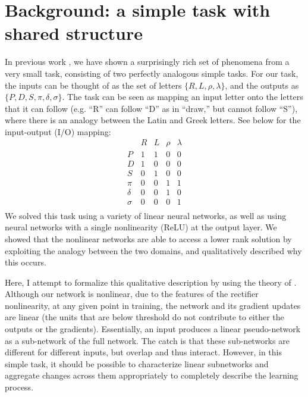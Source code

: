\documentclass[11pt]{article}
\begin{document}
\section{Background: a simple task with shared structure}
In previous work \citep{Lampinen2017}, we have shown a surprisingly rich set of phenomena from a very small task, consisting of two perfectly analogous simple tasks. For our task, the inputs can be thought of as the set of letters \(\{R,L,\rho,\lambda\}\), and the outputs as \(\{P,D,S,\pi,\delta,\sigma\}\). The task can be seen as mapping an input letter onto the letters that it can follow (e.g. ``R'' can follow ``D'' as in ``draw,'' but cannot follow ``S''), where there is an analogy between the Latin and Greek letters. See below for the input-output (I/O) mapping:
\[
\begin{array}{c|cccc} 
& R & L & \rho & \lambda \\
\hline
P & 1 & 1 & 0 & 0 \\ 
D & 1 & 0 & 0 & 0 \\
S & 0 & 1 & 0 & 0 \\
\pi    & 0 & 0 & 1 & 1 \\ 
\delta & 0 & 0 & 1 & 0 \\
\sigma & 0 & 0 & 0 & 1 \\
\end{array} 
\]
We \citep{Lampinen2017} solved this task using a variety of linear neural networks, as well as using neural networks with a single nonlinearity (ReLU) at the output layer. We showed that the nonlinear networks are able to access a lower rank solution by exploiting the analogy between the two domains, and qualitatively described why this occurs. \par
Here, I attempt to formalize this qualitative description by using the theory of \citet{Saxe2013}. Although our network is nonlinear, due to the features of the rectifier nonlinearity, at any given point in training, the network and its gradient updates are linear (the units that are below threshold do not contribute to either the outputs or the gradients). Essentially, an input produces a linear pseudo-network as a sub-network of the full network. The catch is that these sub-networks are different for different inputs, but overlap and thus interact. However, in this simple task, it should be possible to characterize linear subnetworks and aggregate changes across them appropriately to completely describe the learning process. \par
\end{document}

